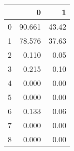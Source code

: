 \begin{tabular}{lrr}
\toprule
{} &       0 &      1 \\
\midrule
0 &  90.661 &  43.42 \\
1 &  78.576 &  37.63 \\
2 &   0.110 &   0.05 \\
3 &   0.215 &   0.10 \\
4 &   0.000 &   0.00 \\
5 &   0.000 &   0.00 \\
6 &   0.133 &   0.06 \\
7 &   0.000 &   0.00 \\
8 &   0.000 &   0.00 \\
\bottomrule
\end{tabular}
